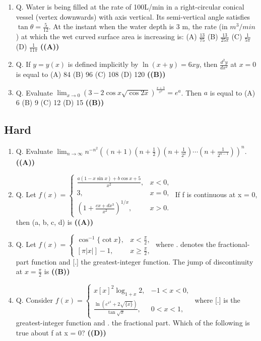 \documentclass{article}
\begin{document}
\begin{enumerate}
and evaluate
$\int_{L_1}^{L_2} \frac{x^3 + 1}{x^2 + 1} dx$.
(A) $\pi$
(B) $\frac{\pi}{2}$
(C) $\frac{\pi}{4}$
(D) 0 \hfill \textbf{((D))}
\item Q. Water is being filled at the rate of 100L/min in a right-circular conical vessel (vertex downwards) with axis vertical. Its semi-vertical angle satisfies $\tan\theta = \frac{5}{12}$. At the instant when the water depth is 3 m, the rate (in $m^3/min$) at which the wet curved surface area is increasing is:
(A) $\frac{13}{75}$
(B) $\frac{13}{25\pi}$
(C) $\frac{1}{5\pi}$
(D) $\frac{1}{11\pi}$ \hfill \textbf{((A))}
\item Q. If $y = y(x)$ is defined implicitly by
$\ln(x + y) = 6xy$,
then $\frac{d^2 y}{dx^2}$ at $x = 0$ is equal to
(A) 84
(B) 96
(C) 108
(D) 120 \hfill \textbf{((B))}
\item Q. Evaluate
$\lim_{x\to 0} (3 - 2 \cos x \sqrt{\cos 2x})^{\frac{x+3}{x^2}} = e^a$.
Then $a$ is equal to
(A) 6
(B) 9
(C) 12
(D) 15 \hfill \textbf{((B))}
\end{enumerate}
\subsection{Hard}
\begin{enumerate}
\item Q. Evaluate $\lim_{n\to\infty} n^{-n^2} ((n+1)(n+\frac{1}{2})(n+\frac{1}{2^2})\cdots(n+\frac{1}{2^{n-1}}))^n$. \hfill \textbf{((A))}
\item Q. Let $f(x) = \begin{cases} \frac{a(1-x \sin x) + b \cos x + 5}{x^2}, & x < 0, \\ 3, & x = 0, \\ (1+\frac{cx + dx^3}{x^2})^{1/x}, & x > 0. \end{cases}$ If f is continuous at x = 0, then (a, b, c, d) is \hfill \textbf{((A))}
\item Q. Let $f(x) = \begin{cases} \cos^{-1}\{ \cot x \}, & x < \frac{\pi}{2}, \\ [\pi |x|] - 1, & x \ge \frac{\pi}{2}, \end{cases}$ where {.} denotes the fractional-part function and [.] the greatest-integer function. The jump of discontinuity at $x = \frac{\pi}{2}$ is \hfill \textbf{((B))}
\item Q. Consider $f(x) = \begin{cases} x [x]^2 \log_{1+x} 2, & -1 < x < 0, \\ \frac{\ln(e^{x^2}+2\sqrt{\{x\}})}{\tan \sqrt{x}}, & 0 < x < 1, \end{cases}$ where [.] is the greatest-integer function and {.} the fractional part. Which of the following is true about f at x = 0? \hfill \textbf{((D))}
\end{enumerate}
\end{document}
